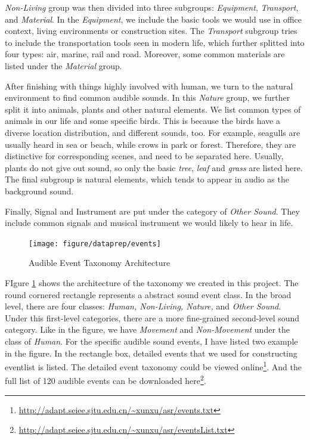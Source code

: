 \textit{Non-Living} group was then divided into three subgroups: \textit{Equipment}, \textit{Transport}, and \textit{Material}. 
In the \textit{Equipment}, we include the basic tools we would use in office context, living environments or construction sites. 
The \textit{Transport} subgroup tries to include the transportation tools seen in modern life, which further splitted into four types: air, marine, rail and road. 
Moreover, some common materials are listed under the \textit{Material} group. 

After finishing with things highly involved with human, we turn to the natural environment to find common audible sounds. 
In this \textit{Nature} group, we further split it into animals, plants and other natural elements. 
We list common types of animals in our life and some specific birds. 
This is because the birds have a diverse location distribution, and different sounds, too. 
For example, seagulls are usually heard in sea or beach, while crows in park or forest. 
Therefore, they are distinctive for corresponding scenes, and need to be separated here. 
Usually, plants do not give out sound, so only the basic \textit{tree}, \textit{leaf} and \textit{grass} are listed here. 
The final subgroup is natural elements, which tends to appear in audio as the background sound.  

Finally, Signal and Instrument are put under the category of \textit{Other Sound}. 
They include common signals and musical instrument we would likely to hear in life. 

\begin{figure}[htb]
\centering
\texttt{[image: figure/dataprep/events]}
\caption{Audible Event Taxonomy Architecture}
\label{fig:events}
\end{figure}

FIgure \ref{fig:events} shows the architecture of the taxonomy we created in this project. 
The round cornered rectangle represents a abstract sound event class.  
In the broad level, there are four classes: \textit{Human, Non-Living, Nature,} and \textit{Other Sound}. 
Under this first-level categories, there are a more fine-grained second-level sound category. 
Like in the figure, we have \textit{Movement} and \textit{Non-Movement} under the class of \textit{Human}. 
For the specific audible sound events, I have listed two example in the figure. 
In the rectangle box, detailed events that we used for constructing eventlist is listed. 
The detailed event taxonomy could be viewed online\footnote{\url{http://adapt.seiee.sjtu.edu.cn/~xunxu/asr/events.txt}}. 
And the full list of 120 audible events can be downloaded here\footnote{\url{http://adapt.seiee.sjtu.edu.cn/~xunxu/asr/eventsList.txt}}.

